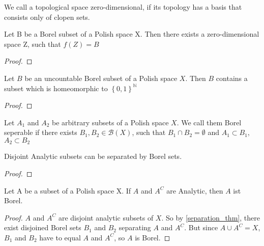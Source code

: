 \documentclass[10pt, a4paper, titlepage]{article}
\numberwithin{equation}{section}
\begin{document}
\begin{definition}
	We call a topological space zero-dimensional, if its topology has a basis that consists only of clopen sets.
\end{definition}

\begin{theorem}
	Let B be a Borel subset of a Polish space X. Then there exists a zero-dimensional space Z, such that $f(Z) = B$
\end{theorem}
\begin{proof}
	
\end{proof}


\begin{theorem}
	Let $B$ be an uncountable Borel subset of a Polish space  $X$. Then  $B$ contains a subset which is homeomorphic to  $\left\{ 0,1 \right\}^\mathbb{N}$
	
\end{theorem}
\begin{proof}
	
\end{proof}


\begin{definition}
	Let $A_1$ and  $A_2$ be arbitrary subsets of a Polish space $X$. We call them Borel seperable if there exists  $B_1,B_2 \in \mathcal{B}\left( X \right) $, such that $B_1 \cap B_2 = \emptyset$ and $A_1 \subset B_1$, $A_2 \subset B_2$ 
\end{definition}


\begin{theorem}
	\label{separation_thm}
	Disjoint Analytic subsets can be separated by Borel sets.
\end{theorem}
\begin{proof}
	
\end{proof}

\begin{theorem}
	Let A be a subset of a Polish space X. If $A$ and  $A^{C}$ are Analytic, then $A$ ist Borel.  
\end{theorem}
\begin{proof}
	$A$ and  $A^C$ are disjoint analytic subsets of $X$. 
	So by  \autoref{separation_thm}, there exist disjoined Borel sets  $B_1$ and $B_2$ separating $A$ and $A^C$. 
	But since $A \cup A^C = X$,  $B_1$ and $B_2$ have to equal $A$ and $A^C$, so  $A$ is Borel.
\end{proof}
\end{document}
